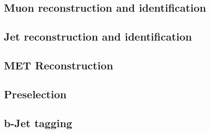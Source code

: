 \subsection{Muon reconstruction and identification} \label{sec:MuonRecoID}

\subsection{Jet reconstruction and identification} \label{sec:JetRecoID}

\subsection{MET Reconstruction} \label{sec:METReco}

\subsection{Preselection} \label{sec:Preselection}

\subsection{b-Jet tagging} \label{sec:BJetTagging}